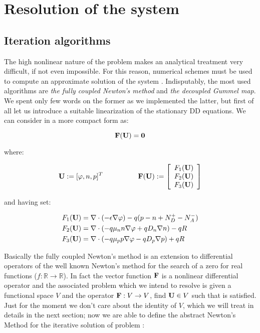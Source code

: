 \chapter{Resolution of the system}

\section{Iteration algorithms}

The high nonlinear nature of the problem 	makes an analytical treatment very difficult, if not even impossible. For this reason, numerical schemes must be used to compute an approximate solution of the system . Indisputably, the most used algorithms are \textit{the fully coupled Newton's method} and \textit{the decoupled Gummel map}. We spent only few words on the former as we implemented the latter, but first of all let us introduce a suitable linearization of the stationary DD equations. We can consider  in a more compact form as:

\begin{equation}
\label{eq: abstract problem fully}
\mathbf{F(U)}=\mathbf{0}
\end{equation}

where:

\begin{equation}
\vect{U}:=[\varphi,n,p]^T \psp{30} \vect{F(U)}:=\left[ \begin{array}{c}
F_1(\vect{U}) \\
F_2(\vect{U}) \\
F_3(\vect{U})
\end{array}
\right]
\end{equation}

and having set:

\begin{align*}
F_1(\mathbf{U}) & = \nabla \cdot (-\epsilon \nabla \varphi) - q(p-n+N_D^+-N_A^-) \\
F_2(\mathbf{U}) & = \nabla \cdot ( - q\mu_n n \nabla \varphi + qD_n \nabla n )-qR \\
F_3(\mathbf{U}) & = \nabla \cdot (- q\mu_p p \nabla \varphi - qD_p \nabla p )+qR
\end{align*}

\vspace{0.1cm}

Basically the fully coupled Newton's method is an extension to differential operators of the well known Newton's method for the search of a zero for real functions ($f:\mathbb{R}\rightarrow \mathbb{R}$). In fact the vector function $\mathbf{F}$ is a nonlinear differential operator and the associated problem which we intend to resolve is given a functional space $V$ and the operator $\mathbf{F}:V\rightarrow V$, find $\mathbf{U}\in V$ such that  is satisfied.
Just for the moment we don't care about the identity of $V$, which we will treat in details in the next section; now we are able to define  the abstract Newton's Method for the iterative solution of problem :

